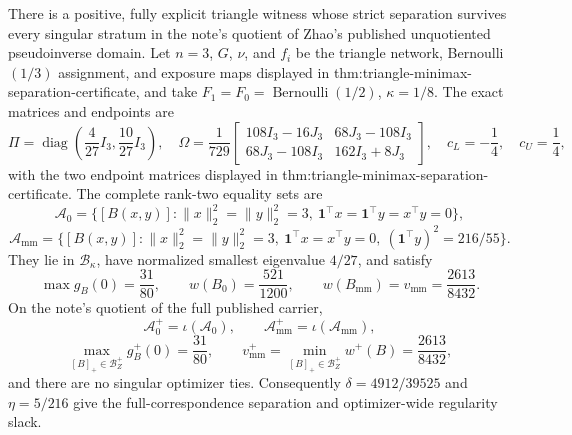There is a positive, fully explicit triangle witness whose strict separation survives every singular stratum in the note's quotient of Zhao's published unquotiented pseudoinverse domain.  Let \(n=3\), \(G\), \(\nu\), and \(f_i\) be the triangle network, Bernoulli \((1/3)\) assignment, and exposure maps displayed in thm:triangle-minimax-separation-certificate, and take \(F_1=F_0=\operatorname{Bernoulli}(1/2)\), \(\kappa=1/8\).  The exact matrices and endpoints are
\[
\Pi=\operatorname{diag}\!\left(\frac4{27}I_3,\frac{10}{27}I_3\right),
\quad
\Omega=\frac1{729}
\begin{bmatrix}108I_3-16J_3&68J_3-108I_3\\68J_3-108I_3&162I_3+8J_3\end{bmatrix},
\quad c_L=-\frac14,\quad c_U=\frac14,
\]
with the two endpoint matrices displayed in thm:triangle-minimax-separation-certificate.  The complete rank-two equality sets are
\[
\mathcal A_0=\{[B(x,y)]:\lVert x\rVert_2^2=\lVert y\rVert_2^2=3,
\ \mathbf1^\top x=\mathbf1^\top y=x^\top y=0\},
\]
\[
\mathcal A_{\mathrm{mm}}=\{[B(x,y)]:\lVert x\rVert_2^2=\lVert y\rVert_2^2=3,
\ \mathbf1^\top x=x^\top y=0,\ (\mathbf1^\top y)^2=216/55\}.
\]
They lie in \(\mathcal B_\kappa\), have normalized smallest eigenvalue \(4/27\), and satisfy
\[
\max g_B(0)=\frac{31}{80},
\qquad w(B_0)=\frac{521}{1200},
\qquad w(B_{\mathrm{mm}})=v_{\mathrm{mm}}=\frac{2613}{8432}.
\]
On the note's quotient of the full published carrier,
\[
\mathcal A_0^+=\iota(\mathcal A_0),
\qquad \mathcal A_{\mathrm{mm}}^+=\iota(\mathcal A_{\mathrm{mm}}),
\]
\[
\max_{[B]_+\in\mathcal B_Z^+}g_B^+(0)=\frac{31}{80},
\qquad v_{\mathrm{mm}}^+=\min_{[B]_+\in\mathcal B_Z^+}w^+(B)=\frac{2613}{8432},
\]
and there are no singular optimizer ties.  Consequently \(\delta=4912/39525\) and \(\eta=5/216\) give the full-correspondence separation and optimizer-wide regularity slack.